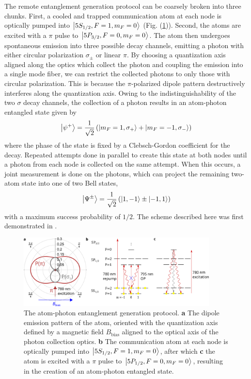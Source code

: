 The remote entanglement generation protocol can be coarsely broken into three chunks. First, a cooled and trapped communication atom at each node is optically pumped into $\ket{5S_{1/2},F=1,m_F=0}$ (Fig. (\ref{fig:entanglement_generation_steps})). Second, the atoms are excited with a $\pi$ pulse to $\ket{5P_{3/2},F=0,m_F=0}$. The atom then undergoes spontaneous emission into three possible decay channels, emitting a photon with either circular polarization $\sigma_{\pm}$ or linear $\pi$. By choosing a quantization axis aligned along the optics which collect the photon and coupling the emission into a single mode fiber, we can restrict the collected photons to only those with circular polarization. This is because the $\pi$-polarized dipole pattern destructively interferes along the quantization axis. Owing to the indistinguishability of the two $\sigma$ decay channels, the collection of a photon results in an atom-photon entangled state given by
\begin{equation}\label{eq:atomphotonstates}
    \ket{\psi^+}=\frac{1}{\sqrt{2}}\left(\ket{m_F=1, \sigma_+}+\ket{m_F=-1,\sigma_-}\right)
\end{equation}
where the phase of the state is fixed by a Clebsch-Gordon coefficient for the decay. Repeated attempts done in parallel to create this state at both nodes until a photon from each node is collected on the same attempt. When this occurs, a joint measurement is done on the photons, which can project the remaining two-atom state into one of two Bell states,
\begin{equation}\label{eq:atomatomstates}
    \ket{\Psi^{\pm}} =\frac{1}{\sqrt{2}}\left(\ket{1,-1}\pm\ket{-1,1}\right)
\end{equation}
with a maximum success probability of $1/2$. The scheme described here was first demonstrated in \cite{Hofmann2012}.

\begin{figure}[!ht]
    \centering
    \includegraphics[width=0.9\textwidth]{Images/rb87_atomphoton_entanglement_and_photon_emission_pattern2.pdf}
    \caption{The atom-photon entanglement generation protocol. \textbf{a} The dipole emission pattern of the atom, oriented with the quantization axis defined by a magnetic field $B_{\text{bias}}$ aligned to the optical axis of the photon collection optics. \textbf{b} The communication atom at each node is optically pumped into $\ket{5S_{1/2},F=1,m_F=0}$, after which \textbf{c} the atom is excited with a $\pi$ pulse to $\ket{5P_{1/2},F=0,m_F=0}$, resulting in the creation of an atom-photon entangled state.}
    \label{fig:entanglement_generation_steps}
\end{figure}

